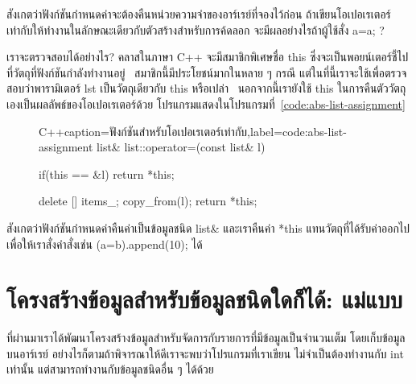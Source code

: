 \begin{quiz}{}
สังเกต{\wbr}ว่า{\wbr}ฟังก์ชัน{\wbr}กำหนด{\wbr}ค่า{\wbr}จะ{\wbr}ต้อง{\wbr}คืน{\wbr}หน่วยความจำ{\wbr}ของ{\wbr}อาร์เรย์{\wbr}ที่{\wbr}จอง{\wbr}ไว้{\wbr}ก่อน{\wbr}
ถ้า{\wbr}เขียน{\wbr}โอ{\wbr}เปอเรเตอร์{\wbr}เท่า{\wbr}กับ{\wbr}ให้{\wbr}ทำงาน{\wbr}ใน{\wbr}ลักษณะ{\wbr}เดียวกับ{\wbr}ตัว{\wbr}สร้าง{\wbr}สำหรับ{\wbr}การ{\wbr}ค้{\wbr}ดล{\wbr}อก{\wbr}
จะ{\wbr}มี{\wbr}ผล{\wbr}อย่างไร{\wbr}ถ้า{\wbr}ผู้ใช้{\wbr}สั่ง {\ct a=a;} ?
\end{quiz}

เรา{\wbr}จะ{\wbr}ตรวจสอบ{\wbr}ได้{\wbr}อย่างไร?  ค{\wbr}ลา{\wbr}ส{\wbr}ใน{\wbr}ภาษา C++ จะ{\wbr}มี{\wbr}สมาชิกพิเศษ{\wbr}ชื่อ {\ct this}
ซึ่ง{\wbr}จะ{\wbr}เป็น{\wbr}พอยน์เตอร์{\wbr}ชี้{\wbr}ไป{\wbr}ที่{\wbr}วัตถุ{\wbr}ที่{\wbr}ฟังก์ชัน{\wbr}กำลัง{\wbr}ทำงาน{\wbr}อยู่ \ สมาชิก{\wbr}นี้{\wbr}มี{\wbr}ประโยชน์{\wbr}มาก{\wbr}ใน{\wbr}หลาย ๆ
กรณี แต่{\wbr}ใน{\wbr}ที่นี้{\wbr}เรา{\wbr}จะ{\wbr}ใช้{\wbr}เพื่อ{\wbr}ตรวจสอบ{\wbr}ว่า{\wbr}พารามิเตอร์ {\ct lst} เป็น{\wbr}วัตถุ{\wbr}เดียวกับ {\ct
  this} หรือเปล่า \ นอกจากนี้{\wbr}เรา{\wbr}ยัง{\wbr}ใช้ {\ct this}
ใน{\wbr}การ{\wbr}คืนตัว{\wbr}วัตถุ{\wbr}เอง{\wbr}เป็น{\wbr}ผลลัพธ์{\wbr}ของ{\wbr}โอ{\wbr}เปอเรเตอร์{\wbr}ด้วย{\wbr}
โปรแกรม{\wbr}แสดง{\wbr}ใน{\wbr}โปรแกรม{\wbr}ที่~\ref{code:abs-list-assignment}

\begin{figure}
\latintext
\begin{codelist}{C++}{caption={\thaitext ฟังก์ชัน{\wbr}สำหรับ{\wbr}โอ{\wbr}เปอเรเตอร์{\wbr}เท่า{\wbr}กับ\latintext},label=code:abs-list-assignment}
list& list::operator=(const list& l)
{
  if(this == &l)
    return *this;

  delete [] items_;
  copy_from(l);
  return *this;
}
\end{codelist}
\thaitext
\end{figure}

สังเกต{\wbr}ว่า{\wbr}ฟังก์ชัน{\wbr}กำหนด{\wbr}ค่า{\wbr}คืน{\wbr}ค่า{\wbr}เป็น{\wbr}ข้อมูล{\wbr}ชนิด {\ct list\&} และ{\wbr}เรา{\wbr}คืน{\wbr}ค่า {\ct
  *this} แทน{\wbr}วัตถุ{\wbr}ที่{\wbr}ได้{\wbr}รับ{\wbr}ค่า{\wbr}ออก{\wbr}ไป เพื่อให้{\wbr}เรา{\wbr}สั่ง{\wbr}คำสั่ง{\wbr}เช่น {\ct
  (a=b).append(10); } ได้{\wbr}


\section{โครงสร้าง{\wbr}ข้อมูล{\wbr}สำหรับ{\wbr}ข้อมูล{\wbr}ชนิด{\wbr}ใด{\wbr}ก็ได้: แม่แบบ}
ที่{\wbr}ผ่าน{\wbr}มา{\wbr}เรา{\wbr}ได้{\wbr}พัฒนา{\wbr}โครงสร้าง{\wbr}ข้อมูล{\wbr}สำหรับ{\wbr}จัดการ{\wbr}กับ{\wbr}รายการ{\wbr}ที่{\wbr}มี{\wbr}ข้อมูล{\wbr}เป็น{\wbr}จำนวนเต็ม{\wbr}
โดย{\wbr}เก็บ{\wbr}ข้อมูล{\wbr}บน{\wbr}อาร์เรย์ อย่างไรก็ตาม{\wbr}ถ้า{\wbr}พิจารณา{\wbr}ให้{\wbr}ดี{\wbr}เรา{\wbr}จะ{\wbr}พบ{\wbr}ว่า{\wbr}โปรแกรม{\wbr}ที่{\wbr}เรา{\wbr}เขียน{\wbr}
ไม่{\wbr}จำเป็น{\wbr}ต้อง{\wbr}ทำงาน{\wbr}กับ {\ct int} เท่านั้น แต่{\wbr}สามารถ{\wbr}ทำงาน{\wbr}กับ{\wbr}ข้อมูล{\wbr}ชนิด{\wbr}อื่น ๆ ได้{\wbr}ด้วย{\wbr}

